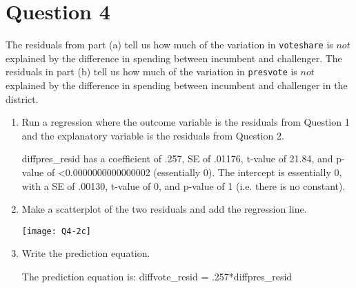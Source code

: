 \documentclass[12pt,letterpaper]{article}
\begin{document}
\section*{Question 4}%
\noindent The residuals from part (a) tell us how much of the variation in \texttt{voteshare} is $not$ explained by the difference in spending between incumbent and challenger. The residuals in part (b) tell us how much of the variation in \texttt{presvote} is $not$ explained by the difference in spending between incumbent and challenger in the district.
	\begin{enumerate}
		\item Run a regression where the outcome variable is the residuals from Question 1 and the explanatory variable is the residuals from Question 2.	
			\vspace{.5cm}
	
			\vspace{.25cm}
diffpres\_resid has a coefficient of .257, SE of .01176, t-value of 21.84, and p-value of \textless0.0000000000000002 (essentially 0).
The intercept is essentially 0, with a SE of .00130, t-value of 0, and p-value of 1 (i.e. there is no constant).
			\vspace{1cm}
		\item Make a scatterplot of the two residuals and add the regression line.
			\vspace{.5cm}
	
			\vspace{.25cm}
\texttt{[image: Q4-2c]}	
			\vspace{1cm}
		\item Write the prediction equation.
			\vspace{.5cm}
	
			\vspace{.25cm}
The prediction equation is: diffvote\_resid = .257*diffpres\_resid
	\end{enumerate}	
	\newpage	
\end{document}
